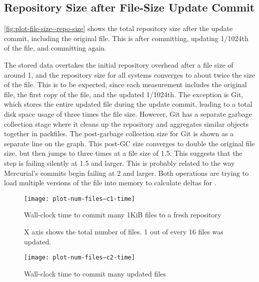\cleardoublepage

\subsection{Repository Size after File-Size Update Commit}

\autoref{fig:plot-file-size--repo-size} shows the total repository size after
the update \gls{commit}, including the original file. This is after committing,
updating \num{1/1024}th of the file, and committing again.

The stored data overtakes the initial repository overhead after a file size of
around \SI{1}{\mib}, and the repository size for all systems converges to about
twice the size of the file. This is to be expected, since each measurement
includes the original file, the first copy of the file, and the updated
\num{1/1024}th. The exception is Git, which stores the entire updated file
during the update \gls{commit}, leading to a total disk space usage of three
times the file size. However, Git has a separate garbage collection stage where
it cleans up the repository and aggregates similar objects together in
\glspl{packfile}. The post-garbage collection size for Git is shown as a
separate line on the graph. This post-GC size converges to double the original
file size, but then jumps to three times at a file size of \SI{1.5}{\gib}. This
suggests that the  step is failing silently at
\SI{1.5}{\gib} and larger. This is probably related to the way Mercurial's
\glspl{commit} begin failing at \SI{2}{\gib} and larger. Both operations are
trying to load multiple versions of the file into memory to calculate deltas for
.

%



\begin{figure}[p]
    \begin{leftfullpage}
        \caption{Wall-clock time to commit many 1KiB files to a fresh repository}
        \label{fig:plot-num-files--c1-time}
        \centering

        \explainlogsubfig

        \texttt{[image: plot-num-files--c1-time]}
    \end{leftfullpage}
\end{figure}

\begin{figure}[p]
    \begin{leftfullpage}
        \caption{Wall-clock time to commit many updated files}
        \label{fig:plot-num-files--c2-time}
        \centering

        X axis shows the total number of files. 1 out of every 16 files was updated.
        \explainlogsubfig

        \texttt{[image: plot-num-files--c2-time]}
    \end{leftfullpage}
\end{figure}

